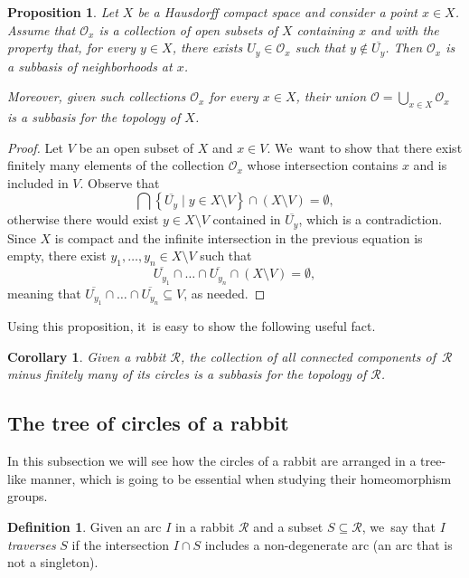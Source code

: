\documentclass[JEP,XML,SOM,Unicode,NoFloatCountersInSection,published]{cedram}
\theoremstyle{plain}
\newtheorem{corollary}[theorem]{Corollary}
\newtheorem{proposition}[theorem]{Proposition}
\theoremstyle{definition}
\newtheorem{definition}[theorem]{Definition}
\theoremstyle{remark}
\newcommand{\R}{\mathcal{R}}
\begin{document}
\begin{proposition}
\label{prop.subbasis}
Let $X$ be a Hausdorff compact space and consider a point $x \in X$.
Assume that $\mathcal{O}_x$ is a collection of open subsets of $X$ containing $x$ and with the property that, for every $y \in X$, there exists $U_y \in \mathcal{O}_x$ such that $y \notin \overline{U_y}$.
Then $\mathcal{O}_x$ is a subbasis of neighborhoods at $x$.

Moreover, given such collections $\mathcal{O}_x$ for every $x \in X$, their union $\mathcal{O} = \bigcup_{x \in X} \mathcal{O}_x$ is a subbasis for the topology of $X$.
\end{proposition}

\begin{proof}
Let $V$ be an open subset of $X$ and $x \in V$. We~want to show that there exist finitely many elements of the collection $\mathcal{O}_x$ whose intersection contains $x$ and is included in $V$.
Observe that
\[
 \bigcap \left\{ \overline{U_y} \mid y \in X \setminus V \right\} \cap (X \setminus V) = \emptyset, 
\]
otherwise there would exist $y \in X \setminus V$ contained in $\overline{U_y}$, which is a contradiction.
Since $X$ is compact and the infinite intersection in the previous equation is empty, there exist $y_1, \dots, y_n \in X \setminus V$ such that
\[
 \overline{U_{y_1}} \cap \dots \cap \overline{U_{y_n}} \cap (X \setminus V) = \emptyset, 
\]
meaning that $\overline{U_{y_1}} \cap \dots \cap \overline{U_{y_n}} \subseteq V$, as needed.
\end{proof}

Using this proposition, it~is easy to show the following useful fact.

\begin{corollary}
\label{cor.rabbit.subbasis}
Given a rabbit $\R$, the collection of all connected components of~$\R$ minus finitely many of its circles is a subbasis for the topology of $\R$.
\end{corollary}

\subsection{The tree of circles of a rabbit}\label{sec.tree.circles.rabbit}

In this subsection we will see how the circles of a rabbit are arranged in a tree-like manner, which is going to be essential when studying their homeomorphism groups.

\begin{definition}
\label{def.traverse}
Given an arc $I$ in a rabbit $\R$ and a subset $S \subseteq \R$, we~say that $I$ \emph{traverses} $S$ if the intersection $I \cap S$ includes a non-degenerate arc (\ie an arc that is not a singleton).
\end{definition}
\end{document}
